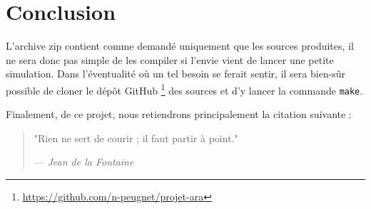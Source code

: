\documentclass[french]{article}
\begin{document}
\section*{Conclusion}

L'archive zip contient comme demandé uniquement que les sources produites, il ne sera donc pas simple de les compiler si l'envie vient de lancer une petite simulation.
Dans l'éventualité où un tel besoin se ferait sentir, il sera bien-sûr possible de cloner le dépôt GitHub
\footnote{\url{https://github.com/n-peugnet/projet-ara}}
des sources et d'y lancer la commande \lstinline{make}.

Finalement, de ce projet, nous retiendrons principalement la citation suivante :

\begin{quotation}
	"Rien ne sert de courir ; il faut partir à point."

	--- \emph{Jean de la Fontaine}
\end{quotation}
\end{document}
